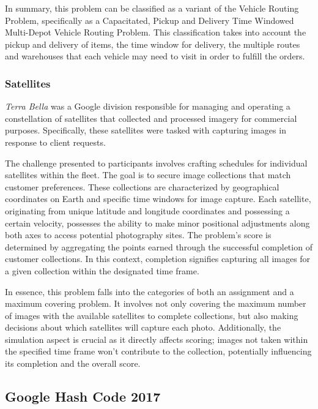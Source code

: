 In summary, this problem can be classified as a variant of the Vehicle Routing
Problem, specifically as a Capacitated, Pickup and Delivery Time Windowed
Multi-Depot Vehicle Routing Problem. This classification takes into account the
pickup and delivery of items, the time window for delivery, the multiple routes
and warehouses that each vehicle may need to visit in order to fulfill the
orders.

\subsubsection*{Satellites}
\label{subsubsec:hashcode-2016-final}

\textit{Terra Bella} was a Google division responsible for managing and
operating a constellation of satellites that collected and processed imagery for
commercial purposes. Specifically, these satellites were tasked with capturing
images in response to client requests.

The challenge presented to participants involves crafting schedules for
individual satellites within the fleet. The goal is to secure image collections
that match customer preferences. These collections are characterized by
geographical coordinates on Earth and specific time windows for image capture.
Each satellite, originating from unique latitude and longitude coordinates and
possessing a certain velocity, possesses the ability to make minor positional
adjustments along both axes to access potential photography sites. The problem's
score is determined by aggregating the points earned through the successful
completion of customer collections. In this context, completion signifies
capturing all images for a given collection within the designated time frame.

In essence, this problem falls into the categories of both an assignment and a
maximum covering problem. It involves not only covering the maximum number of
images with the available satellites to complete collections, but also making
decisions about which satellites will capture each photo. Additionally, the
simulation aspect is crucial as it directly affects scoring; images not taken
within the specified time frame won't contribute to the collection, potentially
influencing its completion and the overall score.

\subsection{Google Hash Code 2017}
\label{subsec:hashcode-2017}

